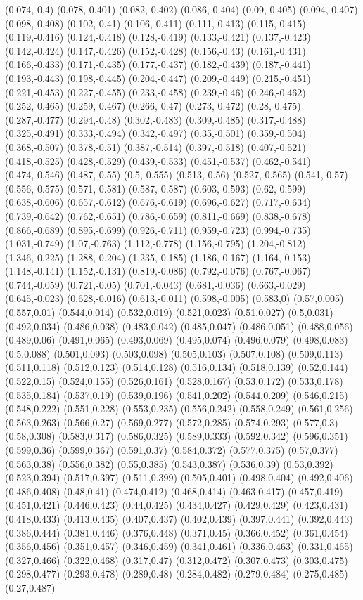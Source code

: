 (0.074,-0.4) (0.078,-0.401) (0.082,-0.402) (0.086,-0.404) (0.09,-0.405) (0.094,-0.407) (0.098,-0.408) (0.102,-0.41) (0.106,-0.411) (0.111,-0.413) (0.115,-0.415) (0.119,-0.416) (0.124,-0.418) (0.128,-0.419) (0.133,-0.421) (0.137,-0.423) (0.142,-0.424) (0.147,-0.426) (0.152,-0.428) (0.156,-0.43) (0.161,-0.431) (0.166,-0.433) (0.171,-0.435) (0.177,-0.437) (0.182,-0.439) (0.187,-0.441) (0.193,-0.443) (0.198,-0.445) (0.204,-0.447) (0.209,-0.449) (0.215,-0.451) (0.221,-0.453) (0.227,-0.455) (0.233,-0.458) (0.239,-0.46) (0.246,-0.462) (0.252,-0.465) (0.259,-0.467) (0.266,-0.47) (0.273,-0.472) (0.28,-0.475) (0.287,-0.477) (0.294,-0.48) (0.302,-0.483) (0.309,-0.485) (0.317,-0.488) (0.325,-0.491) (0.333,-0.494) (0.342,-0.497) (0.35,-0.501) (0.359,-0.504) (0.368,-0.507) (0.378,-0.51) (0.387,-0.514) (0.397,-0.518) (0.407,-0.521) (0.418,-0.525) (0.428,-0.529) (0.439,-0.533) (0.451,-0.537) (0.462,-0.541) (0.474,-0.546) (0.487,-0.55) (0.5,-0.555) (0.513,-0.56) (0.527,-0.565) (0.541,-0.57) (0.556,-0.575) (0.571,-0.581) (0.587,-0.587) (0.603,-0.593) (0.62,-0.599) (0.638,-0.606) (0.657,-0.612) (0.676,-0.619) (0.696,-0.627) (0.717,-0.634) (0.739,-0.642) (0.762,-0.651) (0.786,-0.659) (0.811,-0.669) (0.838,-0.678) (0.866,-0.689) (0.895,-0.699) (0.926,-0.711) (0.959,-0.723) (0.994,-0.735) (1.031,-0.749) (1.07,-0.763) (1.112,-0.778) (1.156,-0.795) (1.204,-0.812) (1.346,-0.225) (1.288,-0.204) (1.235,-0.185) (1.186,-0.167) (1.164,-0.153) (1.148,-0.141) (1.152,-0.131) (0.819,-0.086) (0.792,-0.076) (0.767,-0.067) (0.744,-0.059) (0.721,-0.05) (0.701,-0.043) (0.681,-0.036) (0.663,-0.029) (0.645,-0.023) (0.628,-0.016) (0.613,-0.011) (0.598,-0.005) (0.583,0) (0.57,0.005) (0.557,0.01) (0.544,0.014) (0.532,0.019) (0.521,0.023) (0.51,0.027) (0.5,0.031) (0.492,0.034) (0.486,0.038) (0.483,0.042) (0.485,0.047) (0.486,0.051) (0.488,0.056) (0.489,0.06) (0.491,0.065) (0.493,0.069) (0.495,0.074) (0.496,0.079) (0.498,0.083) (0.5,0.088) (0.501,0.093) (0.503,0.098) (0.505,0.103) (0.507,0.108) (0.509,0.113) (0.511,0.118) (0.512,0.123) (0.514,0.128) (0.516,0.134) (0.518,0.139) (0.52,0.144) (0.522,0.15) (0.524,0.155) (0.526,0.161) (0.528,0.167) (0.53,0.172) (0.533,0.178) (0.535,0.184) (0.537,0.19) (0.539,0.196) (0.541,0.202) (0.544,0.209) (0.546,0.215) (0.548,0.222) (0.551,0.228) (0.553,0.235) (0.556,0.242) (0.558,0.249) (0.561,0.256) (0.563,0.263) (0.566,0.27) (0.569,0.277) (0.572,0.285) (0.574,0.293) (0.577,0.3) (0.58,0.308) (0.583,0.317) (0.586,0.325) (0.589,0.333) (0.592,0.342) (0.596,0.351) (0.599,0.36) (0.599,0.367) (0.591,0.37) (0.584,0.372) (0.577,0.375) (0.57,0.377) (0.563,0.38) (0.556,0.382) (0.55,0.385) (0.543,0.387) (0.536,0.39) (0.53,0.392) (0.523,0.394) (0.517,0.397) (0.511,0.399) (0.505,0.401) (0.498,0.404) (0.492,0.406) (0.486,0.408) (0.48,0.41) (0.474,0.412) (0.468,0.414) (0.463,0.417) (0.457,0.419) (0.451,0.421) (0.446,0.423) (0.44,0.425) (0.434,0.427) (0.429,0.429) (0.423,0.431) (0.418,0.433) (0.413,0.435) (0.407,0.437) (0.402,0.439) (0.397,0.441) (0.392,0.443) (0.386,0.444) (0.381,0.446) (0.376,0.448) (0.371,0.45) (0.366,0.452) (0.361,0.454) (0.356,0.456) (0.351,0.457) (0.346,0.459) (0.341,0.461) (0.336,0.463) (0.331,0.465) (0.327,0.466) (0.322,0.468) (0.317,0.47) (0.312,0.472) (0.307,0.473) (0.303,0.475) (0.298,0.477) (0.293,0.478) (0.289,0.48) (0.284,0.482) (0.279,0.484) (0.275,0.485) (0.27,0.487) 